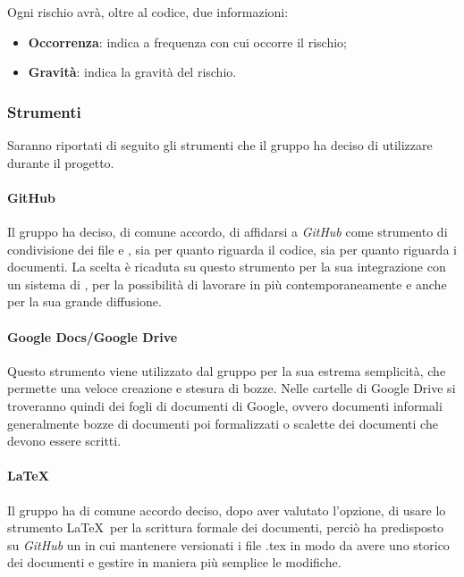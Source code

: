 Ogni rischio avrà, oltre al codice, due informazioni:
\begin{itemize}
	\item \textbf{Occorrenza}: indica a frequenza con cui occorre il rischio;
	\item \textbf{Gravità}: indica la gravità del rischio.
\end{itemize}

\subsubsection{Strumenti}

Saranno riportati di seguito gli strumenti che il gruppo ha deciso di utilizzare durante il progetto.

\paragraph{GitHub}

Il gruppo ha deciso, di comune accordo, di affidarsi a \emph{GitHub} come strumento di condivisione dei file e
, sia per quanto riguarda il codice, sia per quanto riguarda i documenti. La scelta è
ricaduta su questo strumento per la sua integrazione con un sistema di , per la possibilità
di lavorare in più  contemporaneamente e anche per la sua grande diffusione.

\paragraph{Google Docs/Google Drive}

Questo strumento viene utilizzato dal gruppo per la sua estrema semplicità, che permette una veloce creazione e stesura
di bozze. Nelle cartelle di Google Drive si troveranno quindi dei fogli di documenti di Google, ovvero documenti
informali generalmente bozze di documenti poi formalizzati o scalette dei documenti che devono essere scritti.

\paragraph{\LaTeX}

Il gruppo ha di comune accordo deciso, dopo aver valutato l'opzione, di usare lo strumento \LaTeX\ per la scrittura
formale dei documenti, perciò ha predisposto su \emph{GitHub} un  in cui mantenere versionati i
file .tex in modo da avere uno storico dei documenti e gestire in maniera più semplice le modifiche.


